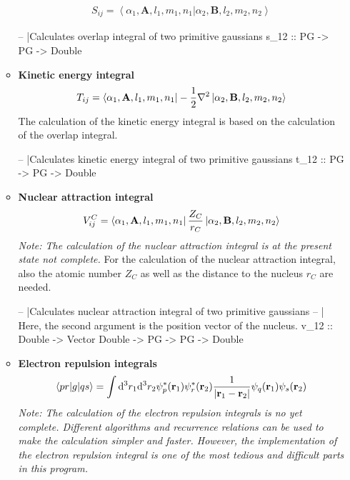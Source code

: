 \documentclass[twoside,        %
			   11pt,			%
               BCOR10mm,       %
               ngerman,english  %
               ]{scrartcl}
\begin{document}
\begin{itemize}
\begin{itemize}
\begin{align*}
S_{ij} = \left<\alpha_1, \mathbf{A}, l_1, m_1, n_1 |\alpha_2, \mathbf{B}, l_2, m_2, n_2 \right>
\end{align*}
\begin{code}
-- |Calculates overlap integral of two primitive gaussians
s_12 :: PG -> PG -> Double
\end{code}
\item \textbf{Kinetic energy integral}\\
\begin{align*}
T_{ij} = \bra{\alpha_1, \mathbf{A}, l_1, m_1, n_1}-\frac{1}{2}\nabla^2\ket{\alpha_2, \mathbf{B}, l_2, m_2, n_2}
\end{align*}
The calculation of the kinetic energy integral is based on the calculation of the overlap integral.
\begin{code}
-- |Calculates kinetic energy integral of two primitive gaussians
t_12 :: PG -> PG -> Double
\end{code}
\item \textbf{Nuclear attraction integral}\\
\begin{align*}
V_{ij}^C = \bra{\alpha_1, \mathbf{A}, l_1, m_1, n_1}\frac{Z_C}{r_C}\ket{\alpha_2, \mathbf{B}, l_2, m_2, n_2}
\end{align*}
\emph{Note: The calculation of the nuclear attraction integral is at the present state not complete.} For the calculation of the nuclear attraction integral, also the atomic number $Z_C$ as well as the distance to the nucleus $r_C$ are needed.
\begin{code}
-- |Calculates nuclear attraction integral of two primitive gaussians
-- | Here, the second argument is the position vector of the nucleus.
v_12 :: Double -> Vector Double -> PG -> PG -> Double
\end{code}
\item \textbf{Electron repulsion integrals}\\
\begin{align*}
\left<pr|g|qs\right> = \int \mathrm{d}^3 r_1 \mathrm{d}^3 r_2 \psi_p^*(\mathbf{r}_1) \psi_r^*(\mathbf{r}_2) \frac{1}{\left| \mathbf{r}_1 -\mathbf{r}_2 \right|} \psi_q(\mathbf{r}_1) \psi_s(\mathbf{r}_2)
\end{align*} \emph{Note: The calculation of the electron repulsion integrals is no yet complete. Different algorithms and recurrence relations can be used to make the calculation simpler and faster. However, the implementation of the electron repulsion integral is one of the most tedious and difficult parts in this program.}
\end{itemize}
\end{itemize}
\end{document}
